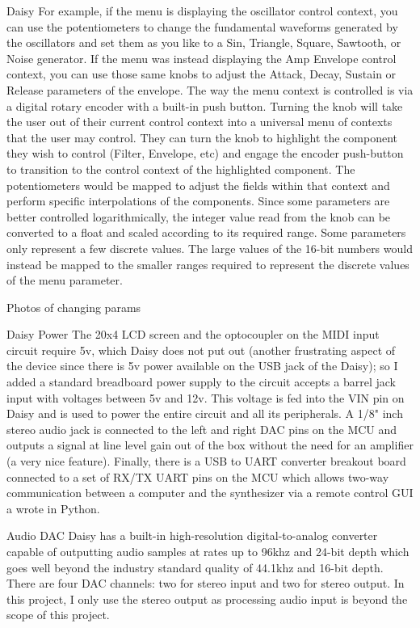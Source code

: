 \documentclass[acmlarge,screen]{acmart}
\begin{document}
Daisy
For example, if the menu is displaying the oscillator control context, you can use the potentiometers to change the fundamental waveforms generated by the oscillators and set them as you like to a Sin, Triangle, Square, Sawtooth, or Noise generator. If the menu was instead displaying the Amp Envelope control context, you can use those same knobs to adjust the Attack, Decay, Sustain or Release parameters of the envelope. The way the menu context is controlled is via a digital rotary encoder with a built-in push button. Turning the knob will take the user out of their current control context into a universal menu of contexts that the user may control. They can turn the knob to highlight the component they wish to control (Filter, Envelope, etc) and engage the encoder push-button to transition to the control context of the highlighted component. The potentiometers would be mapped to adjust the fields within that context and perform specific interpolations of the components. Since some parameters are better controlled logarithmically, the integer value read from the knob can be converted to a float and scaled according to its required range. Some parameters only represent a few discrete values. The large values of the 16-bit numbers would instead be mapped to the smaller ranges required to represent the discrete values of the menu parameter.

Photos of changing params

Daisy
Power
The 20x4 LCD screen and the optocoupler on the MIDI input circuit require 5v, which Daisy does not put out (another frustrating aspect of the device since there is 5v power available on the USB jack of the Daisy); so I added a standard breadboard power supply to the circuit accepts a barrel jack input with voltages between 5v and 12v. This voltage is fed into the VIN pin on Daisy and is used to power the entire circuit and all its peripherals. A 1/8" inch stereo audio jack is connected to the left and right DAC pins on the MCU and outputs a signal at line level gain out of the box without the need for an amplifier (a very nice feature). Finally, there is a USB to UART converter breakout board connected to a set of RX/TX UART pins on the MCU which allows two-way communication between a computer and the synthesizer via a remote control GUI a wrote in Python.

Audio DAC
Daisy has a built-in high-resolution digital-to-analog converter capable of outputting audio samples at rates up to 96khz and 24-bit depth which goes well beyond the industry standard quality of 44.1khz and 16-bit depth. There are four DAC channels: two for stereo input and two for stereo output. In this project, I only use the stereo output as processing audio input is beyond the scope of this project.
\end{document}
